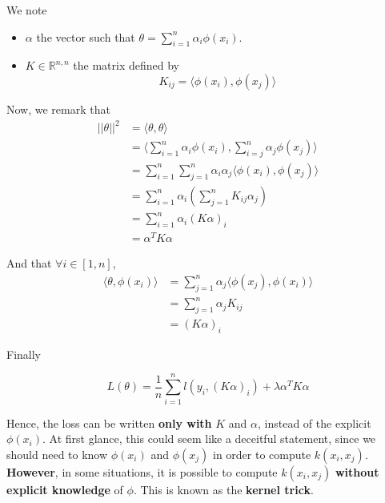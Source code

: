 \documentclass[
10pt, %
a4paper, %
oneside, %
headinclude,footinclude, %
BCOR5mm, %
]{scrartcl}
\begin{document}
We note
\begin{itemize}
    \item $\alpha$ the vector such that $\theta = \sum^{n}_{i=1} \alpha_i\phi(x_i)$.
    \item $K\in \mathbb{R}^{n ,n}$ the matrix defined by
	\begin{equation}
	    K_{ij} = \langle\phi(x_i), \phi(x_j) \rangle 
	\end{equation}
\end{itemize}

Now, we remark that
\begin{equation*}
    \begin{aligned}
	||\theta||^2&= \langle\theta, \theta \rangle\\
	&= \langle \sum^{n}_{i=1} \alpha_i\phi(x_i) , \sum^{n}_{i=j} \alpha_j\phi(x_j)\rangle\\
	&= \sum^{n}_{i=1} \sum^{n}_{j=1} \alpha_i\alpha_j \langle\phi(x_i), \phi(x_j) \rangle\\
	&= \sum^{n}_{i=1} \alpha_i (\sum^{n}_{j=1} K_{ij}\alpha_j)\\
	&= \sum^{n}_{i=1} \alpha_i (K\alpha)_i\\
	&= \alpha^TK\alpha
    \end{aligned}
\end{equation*}

And that $\forall i\in [1, n]$,
\begin{equation*}
    \begin{aligned}
	\langle\theta, \phi(x_i) \rangle&= \sum^{n}_{j=1} \alpha_j \langle\phi(x_j),\phi(x_i) \rangle\\
	&= \sum^{n}_{j=1} \alpha_j K_{ij}\\
	&= (K\alpha)_{i}
    \end{aligned}
\end{equation*}

Finally

\begin{equation}
    L(\theta) = \frac{1}{n} \sum^{n}_{i=1} l(y_i, (K\alpha)_i)+\lambda \alpha^TK\alpha
\end{equation}

Hence, the loss can be written \textbf{{only with }} $K$ and $\alpha$, instead of the explicit $\phi(x_i)$. At first glance, this could seem like a deceitful statement, since we should need to know $\phi(x_i)$ and $\phi(x_j)$ in order to compute $k(x_i, x_j)$. \textbf{{However}}, in some situations, it is possible to compute $k(x_i, x_j)$ \textbf{{without explicit knowledge}} of $\phi$. This is known as the \textbf{{kernel trick}}.
\\
\end{document}
